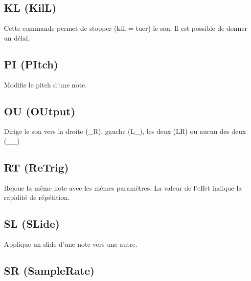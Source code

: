 \subsection{KL (KilL)}


Cette commande permet de stopper (kill = tuer) le son. Il est possible de donner un délai.

\subsection{PI (PItch)}


Modifie le pitch d'une note.


\subsection{OU (OUtput)}


Dirige le son vers la droite (\_R), gauche (L\_), les deux (LR) ou aucun des deux (\_\_)

\subsection{RT (ReTrig)}


Rejoue la même note avec les mêmes paramètres. La valeur de l'effet indique la rapidité de répétition.

\subsection{SL (SLide)}


Applique un slide d'une note vers une autre.

\subsection{SR (SampleRate)}


